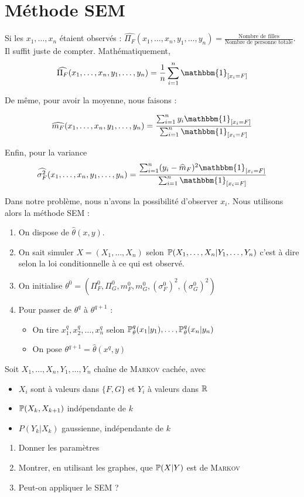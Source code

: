 \section{Méthode SEM}
Si les $x_1,\ldots,x_n$ étaient observés : $\widehat{\Pi_F}(x_1,\ldots,x_n,y_1,\ldots,y_n) = \frac{ \text{Nombre de filles}}{\text{Nombre de personne totale}}$. Il suffit juste de compter. Mathématiquement, 
\[ \widehat{\Pi_F}(x_1,\ldots,x_n,y_1,\ldots,y_n) = \frac{1}{n} \sum_{i=1}^{n} \mathbbm{1}_{[x_i=F]} \]

De même, pour avoir la moyenne, nous faisons :

\[ \widehat{m_F}(x_1,\ldots,x_n,y_1,\ldots,y_n) = \frac{\sum_{i=1}^{n} y_i\mathbbm{1}_{[x_i=F]}}{\sum_{i=1}^n \mathbbm{1}_{[x_i = F]}} \]

Enfin, pour la variance
\[ \widehat{\sigma^2_F}(x_1,\ldots,x_n,y_1,\ldots,y_n) = \frac{\sum_{i=1}^{n} (y_i-\widehat{m}_F)^2 \mathbbm{1}_{[x_i=F]}}{\sum_{i=1}^n \mathbbm{1}_{[x_i = F]}} \]

Dans notre problème, nous n'avons la possibilité d'observer $x_i$. Nous utilisons alors la méthode SEM :
\begin{enumerate}
\item On dispose de $\widehat{\theta}(x,y)$.
\item On sait simuler $X=(X_1,\ldots,X_n)$ selon $\P(X_1,\ldots,X_n\vert Y_1, \ldots, Y_n)$ %
  c'est à dire selon la loi conditionnelle à ce qui est observé.
\item On initialise $\theta^0 = (\Pi_F^0, \Pi_G^0, m_F^0, m_G^0, (\sigma^0_F)^2, (\sigma_G^0)^2)$
\item Pour passer de $\theta^q$ à $\theta^{q+1}$ :
  \begin{itemize}
    \item On tire $x_1^q, x_2^q, \ldots, x_n^q$ selon $\P_\theta^q(x_1 \vert y_1), \ldots, \P_\theta^q(x_n \vert y_n)$
    \item On pose $\theta^{q+1} = \widehat{\theta}(x^q, y)$
  \end{itemize}
\end{enumerate}

\begin{exo}
  Soit $X_1,\ldots,X_n,Y_1,\ldots,Y_n$ chaîne de \textsc{Markov} cachée, avec 
  \begin{itemize}
    \item $X_i$ sont à valeurs dans $\{F,G\}$ et $Y_i$ à valeurs dans $\R$
    \item $\P(X_k,X_{k+1})$ indépendante de $k$
    \item $P(Y_k \vert X_k)$ gaussienne, indépendante de $k$
  \end{itemize}
  \begin{enumerate}
      \item Donner les paramètres
      \item Montrer, en utilisant les graphes, que $\P(X\vert Y)$ est de \textsc{Markov}
      \item Peut-on appliquer le SEM ?
  \end{enumerate}
\end{exo}


